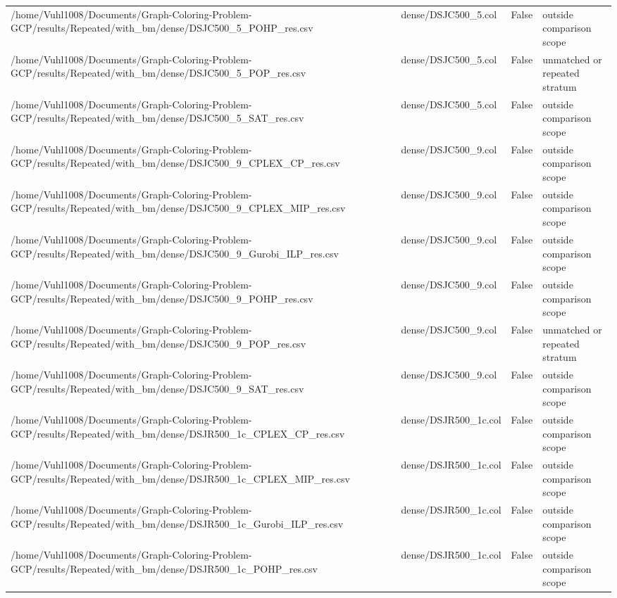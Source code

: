 \begin{table}[htbp]
\begin{tabular}{llll}
/home/Vuhl1008/Documents/Graph-Coloring-Problem-GCP/results/Repeated/with\_bm/dense/DSJC500\_5\_POHP\_res.csv & dense/DSJC500\_5.col & False & outside comparison scope \\
/home/Vuhl1008/Documents/Graph-Coloring-Problem-GCP/results/Repeated/with\_bm/dense/DSJC500\_5\_POP\_res.csv & dense/DSJC500\_5.col & False & unmatched or repeated stratum \\
/home/Vuhl1008/Documents/Graph-Coloring-Problem-GCP/results/Repeated/with\_bm/dense/DSJC500\_5\_SAT\_res.csv & dense/DSJC500\_5.col & False & outside comparison scope \\
/home/Vuhl1008/Documents/Graph-Coloring-Problem-GCP/results/Repeated/with\_bm/dense/DSJC500\_9\_CPLEX\_CP\_res.csv & dense/DSJC500\_9.col & False & outside comparison scope \\
/home/Vuhl1008/Documents/Graph-Coloring-Problem-GCP/results/Repeated/with\_bm/dense/DSJC500\_9\_CPLEX\_MIP\_res.csv & dense/DSJC500\_9.col & False & outside comparison scope \\
/home/Vuhl1008/Documents/Graph-Coloring-Problem-GCP/results/Repeated/with\_bm/dense/DSJC500\_9\_Gurobi\_ILP\_res.csv & dense/DSJC500\_9.col & False & outside comparison scope \\
/home/Vuhl1008/Documents/Graph-Coloring-Problem-GCP/results/Repeated/with\_bm/dense/DSJC500\_9\_POHP\_res.csv & dense/DSJC500\_9.col & False & outside comparison scope \\
/home/Vuhl1008/Documents/Graph-Coloring-Problem-GCP/results/Repeated/with\_bm/dense/DSJC500\_9\_POP\_res.csv & dense/DSJC500\_9.col & False & unmatched or repeated stratum \\
/home/Vuhl1008/Documents/Graph-Coloring-Problem-GCP/results/Repeated/with\_bm/dense/DSJC500\_9\_SAT\_res.csv & dense/DSJC500\_9.col & False & outside comparison scope \\
/home/Vuhl1008/Documents/Graph-Coloring-Problem-GCP/results/Repeated/with\_bm/dense/DSJR500\_1c\_CPLEX\_CP\_res.csv & dense/DSJR500\_1c.col & False & outside comparison scope \\
/home/Vuhl1008/Documents/Graph-Coloring-Problem-GCP/results/Repeated/with\_bm/dense/DSJR500\_1c\_CPLEX\_MIP\_res.csv & dense/DSJR500\_1c.col & False & outside comparison scope \\
/home/Vuhl1008/Documents/Graph-Coloring-Problem-GCP/results/Repeated/with\_bm/dense/DSJR500\_1c\_Gurobi\_ILP\_res.csv & dense/DSJR500\_1c.col & False & outside comparison scope \\
/home/Vuhl1008/Documents/Graph-Coloring-Problem-GCP/results/Repeated/with\_bm/dense/DSJR500\_1c\_POHP\_res.csv & dense/DSJR500\_1c.col & False & outside comparison scope \\

\end{tabular}
\end{table}
